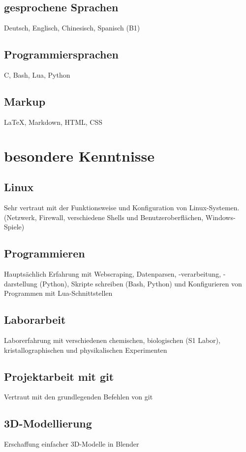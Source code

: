 \documentclass{article}
\begin{document}
\subsection{gesprochene Sprachen}
Deutsch, Englisch, Chinesisch, Spanisch (B1)

\subsection{Programmiersprachen}
C, Bash, Lua, Python

\subsection{Markup}
\LaTeX, Markdown, HTML, CSS

\section{besondere Kenntnisse}

\subsection{Linux}
Sehr vertraut mit der Funktionsweise und Konfiguration von Linux-Systemen.
(Netzwerk, Firewall, verschiedene Shells und Benutzeroberflächen, Windows-Spiele)

\subsection{Programmieren}
Hauptsächlich Erfahrung mit Webscraping, Datenparsen, -verarbeitung, -darstellung (Python), Skripte schreiben (Bash, Python) und Konfigurieren von Programmen mit Lua-Schnittstellen

\subsection{Laborarbeit}
Laborerfahrung mit verschiedenen chemischen, biologischen (S1 Labor), kristallographischen und physikalischen Experimenten

\subsection{Projektarbeit mit git}
Vertraut mit den grundlegenden Befehlen von git

\subsection{3D-Modellierung}
Erschaffung einfacher 3D-Modelle in Blender
\end{document}
